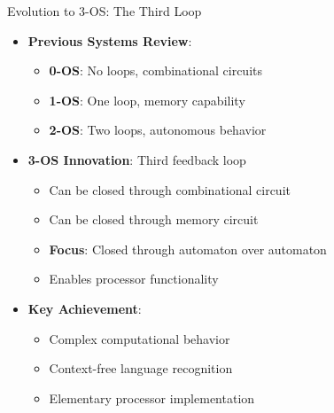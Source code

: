 \documentclass[aspectratio=169,11pt]{beamer}
\newcommand{\concept}[1]{\textbf{\color{accentcolor}#1}}
\begin{document}
\begin{frame}{Evolution to 3-OS: The Third Loop}
\begin{itemize}
\item \concept{Previous Systems Review}:
\begin{itemize}
\item \textbf{0-OS}: No loops, combinational circuits
\item \textbf{1-OS}: One loop, memory capability
\item \textbf{2-OS}: Two loops, autonomous behavior
\end{itemize}
\vspace{0.5cm}
\item \concept{3-OS Innovation}: Third feedback loop
\begin{itemize}
\item Can be closed through combinational circuit
\item Can be closed through memory circuit
\item \textbf{Focus}: Closed through automaton over automaton
\item Enables processor functionality
\end{itemize}
\vspace{0.3cm}
\item \concept{Key Achievement}:
\begin{itemize}
\item Complex computational behavior
\item Context-free language recognition
\item Elementary processor implementation
\end{itemize}
\end{itemize}
\end{frame}
\end{document}
